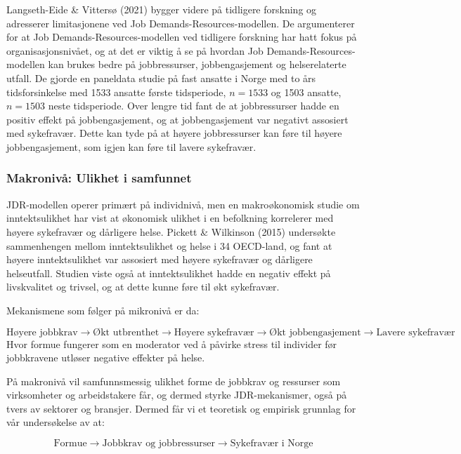 \documentclass[
  12pt,
  a4paper,
  DIV=11,
  numbers=noendperiod]{scrartcl}
\begin{document}
Langseth-Eide \& Vittersø (2021) bygger videre på tidligere forskning og
adresserer limitasjonene ved Job Demands-Resources-modellen. De
argumenterer for at Job Demands-Resources-modellen ved tidligere
forskning har hatt fokus på organisasjonsnivået, og at det er viktig å
se på hvordan Job Demands-Resources-modellen kan brukes bedre på
jobbressurser, jobbengasjement og helserelaterte utfall. De gjorde en
paneldata studie på fast ansatte i Norge med to års tidsforsinkelse med
1533 ansatte første tidsperiode, \(n =1533\) og 1503 ansatte,
\(n = 1503\) neste tidsperiode. Over lengre tid fant de at jobbressurser
hadde en positiv effekt på jobbengasjement, og at jobbengasjement var
negativt assosiert med sykefravær. Dette kan tyde på at høyere
jobbressurser kan føre til høyere jobbengasjement, som igjen kan føre
til lavere sykefravær.

\subsubsection{Makronivå: Ulikhet i
samfunnet}\label{makronivuxe5-ulikhet-i-samfunnet}

JDR-modellen operer primært på individnivå, men en makroøkonomisk studie
om inntektsulikhet har vist at økonomisk ulikhet i en befolkning
korrelerer med høyere sykefravær og dårligere helse. Pickett \&
Wilkinson (2015) undersøkte sammenhengen mellom inntektsulikhet og helse
i 34 OECD-land, og fant at høyere inntektsulikhet var assosiert med
høyere sykefravær og dårligere helseutfall. Studien viste også at
inntektsulikhet hadde en negativ effekt på livskvalitet og trivsel, og
at dette kunne føre til økt sykefravær.

Mekanismene som følger på mikronivå er da:

\[
\text{Høyere jobbkrav} \rightarrow \text{Økt utbrenthet} \rightarrow \text{Høyere sykefravær} \rightarrow \text{Økt jobbengasjement} \rightarrow \text{Lavere sykefravær}
\] Hvor formue fungerer som en moderator ved å påvirke stress til
individer før jobbkravene utløser negative effekter på helse.

På makronivå vil samfunnsmessig ulikhet forme de jobbkrav og ressurser
som virksomheter og arbeidstakere får, og dermed styrke JDR-mekanismer,
også på tvers av sektorer og bransjer. Dermed får vi et teoretisk og
empirisk grunnlag for vår undersøkelse av at:

\[
\text{Formue} \rightarrow \text{Jobbkrav og jobbressurser} \rightarrow \text{Sykefravær i Norge}
\]
\end{document}
